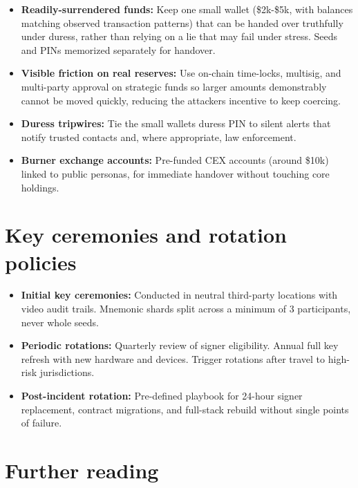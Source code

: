 \begin{itemize}
\tightlist
\item
  \textbf{Readily-surrendered funds:} Keep one small wallet (\$2k-\$5k, with balances matching observed transaction patterns) that can be handed over truthfully under duress, rather than relying on a lie that may fail under stress. Seeds and PINs memorized separately for handover.
\item
  \textbf{Visible friction on real reserves:} Use on-chain time-locks, multisig, and multi-party approval on strategic funds so larger amounts demonstrably cannot be moved quickly, reducing the attacker\textquotesingle s incentive to keep coercing.
\item
  \textbf{Duress tripwires:} Tie the small wallet\textquotesingle s duress PIN to silent alerts that notify trusted contacts and, where appropriate, law enforcement.
\item
  \textbf{Burner exchange accounts:} Pre-funded CEX accounts (around \$10k) linked to public personas, for immediate handover without touching core holdings.
\end{itemize}

\section{Key ceremonies and rotation policies}\label{key-ceremonies-and-rotation-policies}

\begin{itemize}
\tightlist
\item
  \textbf{Initial key ceremonies:} Conducted in neutral third-party locations with video audit trails. Mnemonic shards split across a minimum of 3 participants, never whole seeds.
\item
  \textbf{Periodic rotations:} Quarterly review of signer eligibility. Annual full key refresh with new hardware and devices. Trigger rotations after travel to high-risk jurisdictions.
\item
  \textbf{Post-incident rotation:} Pre-defined playbook for 24-hour signer replacement, contract migrations, and full-stack rebuild without single points of failure.
\end{itemize}

\section{Further reading}\label{further-reading-3}

